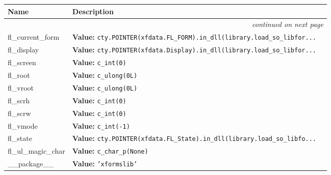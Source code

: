     \vspace{-1cm}
\hspace{\varindent}\begin{longtable}{|p{\varnamewidth}|p{\vardescrwidth}|l}
\cline{1-2}
\cline{1-2} \centering \textbf{Name} & \centering \textbf{Description}& \\
\cline{1-2}
\endhead\cline{1-2}\multicolumn{3}{r}{\small\textit{continued on next page}}\\\endfoot\cline{1-2}
\endlastfoot\raggedright f\-l\-\_\-c\-u\-r\-r\-e\-n\-t\-\_\-f\-o\-r\-m\- & \raggedright \textbf{Value:} 
{\tt cty.POINTER(xfdata.FL\_FORM).in\_dll(library.load\_so\_libfor\texttt{...}}&\\
\cline{1-2}
\raggedright f\-l\-\_\-d\-i\-s\-p\-l\-a\-y\- & \raggedright \textbf{Value:} 
{\tt cty.POINTER(xfdata.Display).in\_dll(library.load\_so\_libfor\texttt{...}}&\\
\cline{1-2}
\raggedright f\-l\-\_\-s\-c\-r\-e\-e\-n\- & \raggedright \textbf{Value:} 
{\tt c\_int(0)}&\\
\cline{1-2}
\raggedright f\-l\-\_\-r\-o\-o\-t\- & \raggedright \textbf{Value:} 
{\tt c\_ulong(0L)}&\\
\cline{1-2}
\raggedright f\-l\-\_\-v\-r\-o\-o\-t\- & \raggedright \textbf{Value:} 
{\tt c\_ulong(0L)}&\\
\cline{1-2}
\raggedright f\-l\-\_\-s\-c\-r\-h\- & \raggedright \textbf{Value:} 
{\tt c\_int(0)}&\\
\cline{1-2}
\raggedright f\-l\-\_\-s\-c\-r\-w\- & \raggedright \textbf{Value:} 
{\tt c\_int(0)}&\\
\cline{1-2}
\raggedright f\-l\-\_\-v\-m\-o\-d\-e\- & \raggedright \textbf{Value:} 
{\tt c\_int(-1)}&\\
\cline{1-2}
\raggedright f\-l\-\_\-s\-t\-a\-t\-e\- & \raggedright \textbf{Value:} 
{\tt cty.POINTER(xfdata.FL\_State).in\_dll(library.load\_so\_libfo\texttt{...}}&\\
\cline{1-2}
\raggedright f\-l\-\_\-u\-l\-\_\-m\-a\-g\-i\-c\-\_\-c\-h\-a\-r\- & \raggedright \textbf{Value:} 
{\tt c\_char\_p(None)}&\\
\cline{1-2}
\raggedright \_\-\_\-p\-a\-c\-k\-a\-g\-e\-\_\-\_\- & \raggedright \textbf{Value:} 
{\tt \texttt{'}\texttt{xformslib}\texttt{'}}&\\
\cline{1-2}
\end{longtable}

